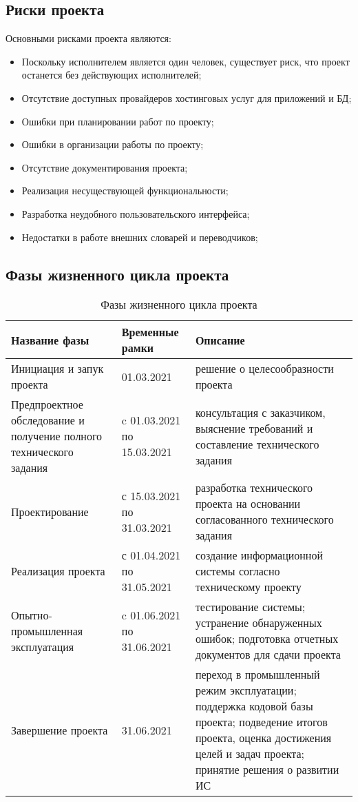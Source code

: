 \documentclass[a4paper,14pt]{extarticle}
\begin{document}
\subsection{Риски проекта}
Основными рисками проекта являются:
\begin{itemize}
    \item Поскольку исполнителем является один человек, существует риск, что
          проект останется без действующих исполнителей;
    \item Отсутствие доступных провайдеров хостинговых услуг для приложений и БД;
    \item Ошибки при планировании работ по проекту;
    \item Ошибки в организации работы по проекту;
    \item Отсутствие документирования проекта;
    \item Реализация несуществующей функциональности;
    \item Разработка неудобного пользовательского интерфейса;
    \item Недостатки в работе внешних словарей и переводчиков;
\end{itemize}

\subsection{Фазы жизненного цикла проекта}
\begin{table}[H]
    \caption{Фазы жизненного цикла проекта}
    \begin{tabular}{ | p{5cm} | p{3cm} | p{8cm} | }
        \hline
        Название фазы & Временные рамки & Описание \\ \hline
        Инициация и запук проекта & 01.03.2021 & решение о целесообразности проекта \\ \hline
        Предпроектное обследование и получение полного технического задания & c 01.03.2021 по 15.03.2021 & консультация с заказчиком, выяснение требований и составление технического задания \\ \hline
        Проектирование & с 15.03.2021 по 31.03.2021 & разработка технического проекта на основании согласованного технического задания \\ \hline
        Реализация проекта & с 01.04.2021 по 31.05.2021 & создание информационной системы согласно техническому проекту \\ \hline
        Опытно-промышленная эксплуатация & c 01.06.2021 по 31.06.2021 & тестирование системы; устранение обнаруженных ошибок; подготовка отчетных документов для сдачи проекта \\ \hline
        Завершение проекта & 31.06.2021 & переход в промышленный режим эксплуатации; поддержка кодовой базы проекта; подведение итогов проекта, оценка достижения целей и задач проекта; принятие решения о развитии ИС \\ \hline
    \end{tabular}
\end{table}
\end{document}
